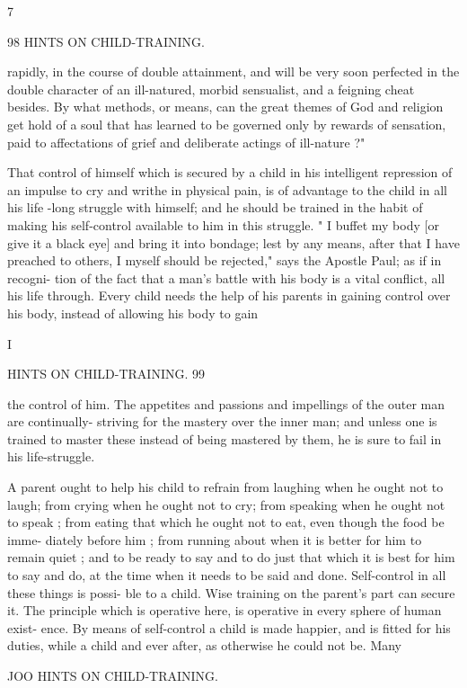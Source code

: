 \documentclass[
]{book}
\begin{document}
7

98 HINTS ON CHILD-TRAINING.

rapidly, in the course of double attainment, and will be very soon perfected in the double character of an ill-natured, morbid sensualist, and a feigning cheat besides. By what methods, or means, can the great themes of God and religion get hold of a soul that has learned to be governed only by rewards of sensation, paid to affectations of grief and deliberate actings of ill-nature ?"

That control of himself which is secured by a child in his intelligent repression of an impulse to cry and writhe in physical pain, is of advantage to the child in all his life -long struggle with himself; and he should be trained in the habit of making his self-control available to him in this struggle. " I buffet my body {[}or give it a black eye{]} and bring it into bondage; lest by any means, after that I have preached to others, I myself should be rejected," says the Apostle Paul; as if in recogni- tion of the fact that a man's battle with his body is a vital conflict, all his life through. Every child needs the help of his parents in gaining control over his body, instead of allowing his body to gain

I

HINTS ON CHILD-TRAINING. 99

the control of him. The appetites and passions and impellings of the outer man are continually- striving for the mastery over the inner man; and unless one is trained to master these instead of being mastered by them, he is sure to fail in his life-struggle.

A parent ought to help his child to refrain from laughing when he ought not to laugh; from crying when he ought not to cry; from speaking when he ought not to speak ; from eating that which he ought not to eat, even though the food be imme- diately before him ; from running about when it is better for him to remain quiet ; and to be ready to say and to do just that which it is best for him to say and do, at the time when it needs to be said and done. Self-control in all these things is possi- ble to a child. Wise training on the parent's part can secure it. The principle which is operative here, is operative in every sphere of human exist- ence. By means of self-control a child is made happier, and is fitted for his duties, while a child and ever after, as otherwise he could not be. Many

JOO HINTS ON CHILD-TRAINING.
\end{document}
